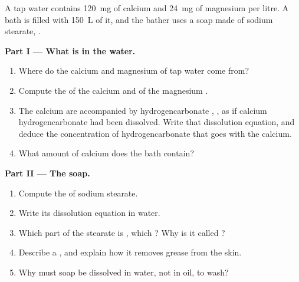 \begin{problem}
\label{pb:g11:dissolution:1}
A tap water contains \qty{120}{mg} of calcium  and \qty{24}{mg} of
magnesium  per litre. A bath is filled with \qty{150}{L} of it, and
the bather uses a soap made of sodium stearate, .

\medskip
\noindent\textbf{Part I --- What is in the water.}
\begin{enumerate}
  \item Where do the calcium and magnesium  of tap water come from?
  \item Compute the  of the calcium  and of the
        magnesium .
  \item The calcium  are accompanied by hydrogencarbonate ,
        , as if calcium hydrogencarbonate  had
        been dissolved. Write that dissolution equation, and deduce the
        concentration of hydrogencarbonate  that goes with the
        calcium.
  \item What amount of calcium  does the bath contain?
\end{enumerate}

\medskip
\noindent\textbf{Part II --- The soap.}
\begin{enumerate}[resume]
  \item Compute the  of sodium stearate.
  \item Write its dissolution equation in water.
  \item Which part of the stearate  is , which
        ? Why is it called ?
  \item Describe a , and explain how it removes grease from the
        skin.
  \item Why must soap be dissolved in water, not in oil, to wash?
\end{enumerate}


\end{problem}

